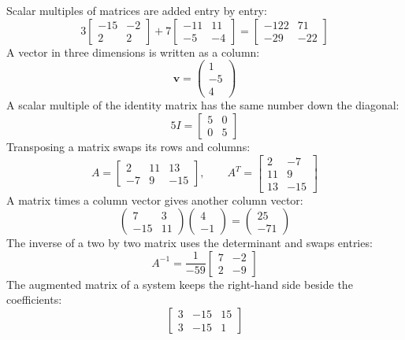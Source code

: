 \documentclass[11pt]{article}
\begin{document}
Scalar multiples of matrices are added entry by entry:
\label{eq019}\[
  3\begin{bmatrix} -15 & -2 \\ 2 & 2 \end{bmatrix} + 7\begin{bmatrix} -11 & 11 \\ -5 & -4 \end{bmatrix} = \begin{bmatrix} -122 & 71 \\ -29 & -22 \end{bmatrix}
\]
A vector in three dimensions is written as a column:
\label{eq020}\[
  \mathbf{v} = \begin{pmatrix} 1 \\ -5 \\ 4 \end{pmatrix}
\]
A scalar multiple of the identity matrix has the same number down the diagonal:
\label{eq021}\[
  5I = \begin{bmatrix} 5 & 0 \\ 0 & 5 \end{bmatrix}
\]
Transposing a matrix swaps its rows and columns:
\label{eq022}\[
  A = \begin{bmatrix} 2 & 11 & 13 \\ -7 & 9 & -15 \end{bmatrix}, \qquad A^{T} = \begin{bmatrix} 2 & -7 \\ 11 & 9 \\ 13 & -15 \end{bmatrix}
\]
A matrix times a column vector gives another column vector:
\label{eq023}\[
  \begin{pmatrix} 7 & 3 \\ -15 & 11 \end{pmatrix}\begin{pmatrix} 4 \\ -1 \end{pmatrix} = \begin{pmatrix} 25 \\ -71 \end{pmatrix}
\]
The inverse of a two by two matrix uses the determinant and swaps entries:
\label{eq024}\[
  A^{-1} = \frac{1}{-59} \begin{bmatrix} 7 & -2 \\ 2 & -9 \end{bmatrix}
\]
The augmented matrix of a system keeps the right-hand side beside the coefficients:
\label{eq025}\[
  \left[ \begin{array}{cc|c} 3 & -15 & 15 \\ 3 & -15 & 1 \end{array} \right]
\]
\end{document}
